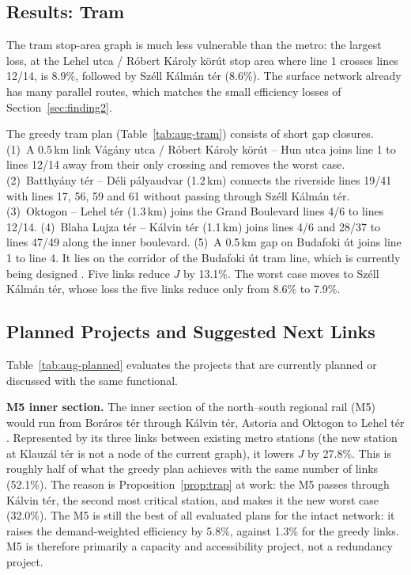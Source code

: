 \documentclass[12pt,a4paper]{article}
\theoremstyle{plain}
\theoremstyle{definition}
\theoremstyle{remark}
\begin{document}
\subsection{Results: Tram}
\label{sec:aug-tram}

The tram stop-area graph is much less vulnerable than the metro: the largest
loss, at the Lehel utca / R\'obert K\'aroly k\"or\'ut stop area where line 1 crosses
lines 12/14, is 8.9\%, followed by Sz\'ell K\'alm\'an t\'er (8.6\%).  The surface
network already has many parallel routes, which matches the small efficiency
losses of Section~\ref{sec:finding2}.



The greedy tram plan (Table~\ref{tab:aug-tram}) consists of short gap
closures.  (1)~A 0.5\,km link V\'ag\'any utca / R\'obert K\'aroly k\"or\'ut --
Hun utca joins line 1 to lines 12/14 away from their only crossing and removes
the worst case.  (2)~Batthy\'any t\'er -- D\'eli p\'alyaudvar (1.2\,km) connects the
riverside lines 19/41 with lines 17, 56, 59 and 61 without passing through
Sz\'ell K\'alm\'an t\'er.  (3)~Oktogon -- Lehel t\'er (1.3\,km)
joins the Grand Boulevard lines 4/6 to lines 12/14.  (4)~Blaha Lujza t\'er --
K\'alvin t\'er (1.1\,km) joins lines 4/6 and 28/37 to lines 47/49 along the
inner boulevard.  (5)~A 0.5\,km gap on Budafoki \'ut joins line 1 to line 4.
It lies on the corridor of the Budafoki \'ut tram line, which is currently
being designed \citep{bkk_budafoki2026}.  Five links reduce
$J$ by 13.1\%.  The worst case moves to Sz\'ell K\'alm\'an t\'er,
whose loss the five links reduce only from 8.6\% to 7.9\%.

\subsection{Planned Projects and Suggested Next Links}
\label{sec:aug-planned}



Table~\ref{tab:aug-planned} evaluates the projects that are currently planned
or discussed with the same functional.

\textbf{M5 inner section.}  The inner section of the north--south regional rail
(M5) would run from Boráros tér through K\'alvin t\'er, Astoria and Oktogon to
Lehel t\'er \citep{wiki_m5}.  Represented by its three links between existing
metro stations (the new station at Klauz\'al t\'er is not a node of the current
graph), it lowers $J$ by 27.8\%.  This is roughly half of what the
greedy plan achieves with the same number of links (52.1\%).  The
reason is Proposition~\ref{prop:trap} at work: the M5 passes through K\'alvin
t\'er, the second most critical station, and makes it the new worst case
(32.0\%).  The M5 is still the best of all evaluated plans for the intact
network: it raises the demand-weighted efficiency by
5.8\%, against 1.3\% for the greedy links.  M5 is
therefore primarily a capacity and accessibility project, not a redundancy project.
\end{document}
